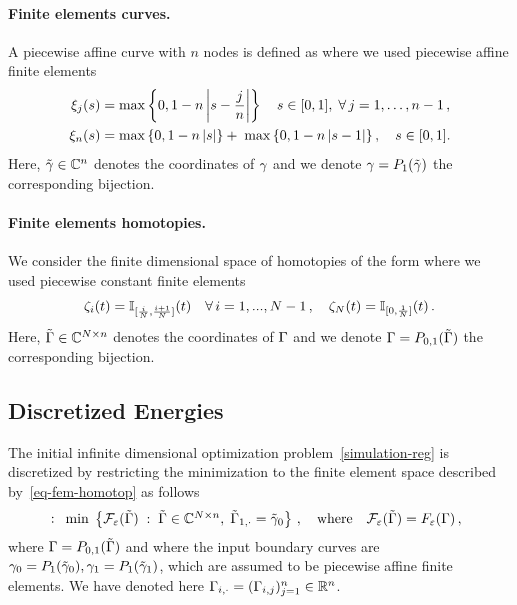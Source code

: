 \paragraph{Finite elements curves.}

A piecewise affine curve with $n$ nodes is defined as
where we used piecewise affine finite elements
\begin{align*}
	\xi_j(s) &= \max\left\{0, 1- n\left| s- \frac{j}{n} \right|\right\} \quad  s\in [0,1],\;  
		\forall \, j= 1, \ldots, n-1 \,,\\
	\xi_n(s) &= \max\left\{0, 1- n\left|s \right|\right\} + \;\max\left\{0, 1- n\left| s- 1 \right|\right\},  \quad s\in [0,1].
\end{align*}
Here, $\tilde{\gamma} \in \mathbb{C}^{n}$ denotes the coordinates of $\gamma$ and we denote $\gamma=P_{1}(\tilde {\gamma})$ the corresponding bijection. 

\paragraph{Finite elements homotopies.}

We consider the finite dimensional space of homotopies of the form
where we used piecewise constant finite elements
\begin{align*}
	\zeta_i(t) =\mathbb{I}{}_{[\frac{i}{N},\frac{i+1}{N}]}(t) \quad  \forall \, i = 1, ..., N-1 \,,\quad 
	\zeta_N(t) =\mathbb{I}{}_{[0,\frac{1}{N}]}(t) \,.
\end{align*}
Here, $\tilde{\Gamma} \in \mathbb{C}^{N \times n}$ denotes the coordinates of $\Gamma$ and we denote $\Gamma=P_{0,1}(\tilde {\Gamma})$ the corresponding bijection. 


\subsection{Discretized Energies}
\label{sec-discretized-energy}

The initial infinite dimensional optimization problem~\eqref{simulation-reg} is discretized by restricting the minimization to the finite element space described by~\eqref{eq-fem-homotop} as follows 
\begin{equation}\label{eq-optim-discrete}:
\begin{array}{c}
	\min \; \left\{ 
		 \mathcal{F}_\varepsilon(\tilde{\Gamma})
	 \;:\; 
		 \tilde{\Gamma} \in \mathbb{C}^{N \times n}, \; 
		 \tilde{\Gamma}_{1,\cdot} = \tilde{\gamma}_0
	 \right\}\,,
	\quad \text{where} \quad	
	\mathcal{F}_\varepsilon(\tilde{\Gamma}) = F_\varepsilon(\Gamma)\,,
\end{array}
\end{equation}
where $\Gamma=P_{0,1}(\tilde {\Gamma})$ and where the input boundary curves are $\gamma_0 = P_1(\tilde{\gamma}_0), \gamma_1 = P_1(\tilde{\gamma}_1)$, which are assumed to be piecewise affine finite elements. We have denoted here $\Gamma_{i,\cdot} = (\Gamma_{i,j})_{j=1}^n \in \mathbb{R}^n$.

